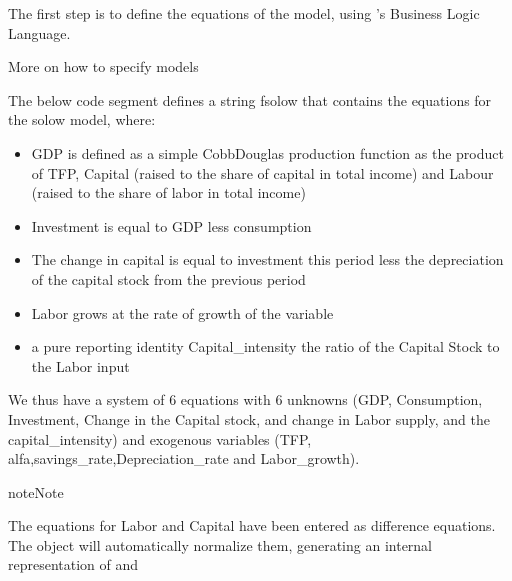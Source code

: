 \documentclass[letterpaper,10pt,english]{jupyterBook}
\begin{document}
\sphinxAtStartPar
The first step is to define the equations of the model, using ’s Business Logic Language.

\begin{sphinxShadowBox}

\sphinxAtStartPar
More on how to specify models 
\end{sphinxShadowBox}

\sphinxAtStartPar
The below code segment defines a string fsolow that contains the equations for the solow model, where:
\begin{itemize}
\item {} 
\sphinxAtStartPar
GDP is defined as a simple Cobb\sphinxhyphen{}Douglas production function as the product of TFP, Capital (raised to the share of capital in total income) and Labour (raised to the share of labor in total income)

\item {} 
\sphinxAtStartPar
Investment is equal to GDP less consumption

\item {} 
\sphinxAtStartPar
The change in capital is equal to investment this period less the depreciation of the capital stock from the previous period

\item {} 
\sphinxAtStartPar
Labor grows at the rate of growth of the variable 

\item {} 
\sphinxAtStartPar
a pure reporting identity Capital\_intensity the ratio of the Capital Stock to the Labor input

\end{itemize}

\sphinxAtStartPar
We thus have a system of 6 equations with 6 unknowns (GDP, Consumption, Investment, Change in the Capital stock, and change in Labor supply, and the capital\_intensity) and exogenous variables (TFP, alfa,savings\_rate,Depreciation\_rate and Labor\_growth).

\begin{sphinxadmonition}{note}{Note}

\sphinxAtStartPar
The equations for Labor and Capital have been entered as difference equations.
The  object will automatically normalize them, generating an internal representation of 
and 
\end{sphinxadmonition}
\end{document}
